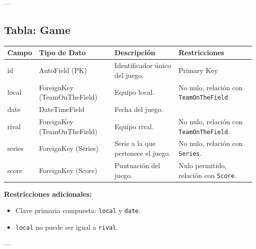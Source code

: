 \documentclass{report}
\begin{document}
    ---
    
    \subsection*{Tabla: Game}
    \begin{tabular}{|>{\raggedright\arraybackslash}p{3cm}|>{\raggedright\arraybackslash}p{3cm}|>{\raggedright\arraybackslash}p{6cm}|>{\raggedright\arraybackslash}p{4cm}|}
        \hline
        \textbf{Campo} & \textbf{Tipo de Dato} & \textbf{Descripción} & \textbf{Restricciones} \\
        \hline
        id & AutoField (PK) & Identificador único del juego. & Primary Key \\
        \hline
        local & ForeignKey (TeamOnTheField) & Equipo local. & No nulo, relación con \texttt{TeamOnTheField}. \\
        \hline
        date & DateTimeField & Fecha del juego. &  \\
        \hline
        rival & ForeignKey (TeamOnTheField) & Equipo rival. & No nulo, relación con \texttt{TeamOnTheField}. \\
        \hline
        series & ForeignKey (Series) & Serie a la que pertenece el juego. & No nulo, relación con \texttt{Series}. \\
        \hline
        score & ForeignKey (Score) & Puntuación del juego. & Nulo permitido, relación con \texttt{Score}. \\
        \hline
    \end{tabular}
    
    \textbf{Restricciones adicionales:}
    \begin{itemize}
        \item Clave primaria compuesta: \texttt{local} y \texttt{date}.
        \item \texttt{local} no puede ser igual a \texttt{rival}.
    \end{itemize}
    
    ---
    
\end{document}
